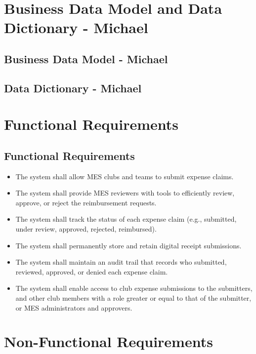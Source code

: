 \documentclass[12pt]{article}
\begin{document}
\section{Business Data Model and Data Dictionary - Michael}
  \subsection{Business Data Model - Michael}
  \subsection{Data Dictionary - Michael}

\section{Functional Requirements}
  \subsection{Functional Requirements}
    \begin{itemize}
      \item The system shall allow MES clubs and teams to submit expense claims.
      \item The system shall provide MES reviewers with tools to efficiently review, approve, or reject the reimbursement requests.
      \item The system shall track the status of each expense claim (e.g., submitted, under review, approved, rejected, reimbursed).
      \item The system shall permanently store and retain digital receipt submissions.
      \item The system shall maintain an audit trail that records who submitted, reviewed, approved, or denied each expense claim.
      \item The system shall enable access to club expense submissions to the submitters, and other club members with a role greater or equal to that of the submitter, or MES administrators and approvers.
    \end{itemize}

\section{Non-Functional Requirements}
\end{document}
